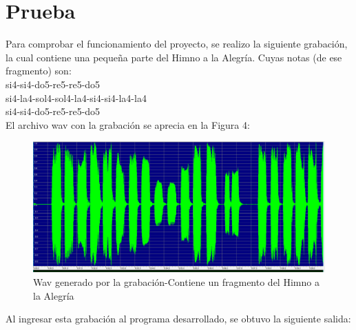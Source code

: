 \section{Prueba}
Para comprobar el funcionamiento del proyecto, se realizo la siguiente grabación, la cual contiene una pequeña parte del Himno a la Alegría. Cuyas notas (de ese fragmento) son:\\
si4-si4-do5-re5-re5-do5\\
si4-la4-sol4-sol4-la4-si4-si4-la4-la4\\
si4-si4-do5-re5-re5-do5\\
El archivo wav con la grabación se aprecia en la Figura 4:
\begin{figure}[H]
	\begin{center}
		\includegraphics[scale=.35]{img/wav.png}
		\caption{Wav generado por la grabación-Contiene un fragmento del Himno a la Alegría}
		\label{fig:wav}
	\end{center}
\end{figure}
Al ingresar esta grabación al programa desarrollado, se obtuvo la siguiente salida:
